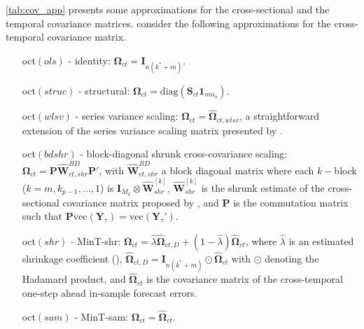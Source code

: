 \documentclass[12pt]{article}
\newcommand{\Ivet}{\bm{I}}
\newcommand{\Pvet}{\bm{P}}
\newcommand{\Svet}{\bm{S}}
\newcommand{\Wvet}{\bm{W}}
\newcommand{\Yvet}{\bm{Y}}
\newcommand{\Omegavet}{\bm{\Omega}}
\theoremstyle{definition}
\begin{document}
\autoref{tab:cov_app} presents some approximations for the cross-sectional and the temporal covariance matrices. \cite{difonzo2023} consider the following approximations for the cross-temporal covariance matrix.
\begin{itemize}[nosep, leftmargin=!, labelwidth=, align=right]
	\item[oct$(ols)$ -] identity: $\Omegavet_{ct} = \Ivet_{n(k^*+m)}$.
	\item[oct$(struc)$ -] structural: $\Omegavet_{ct} = \mathrm{diag}(\Svet_{ct} \mathbf{1}_{mn_b})$.
	\item[oct$(wlsv)$ -] series variance scaling: $\Omegavet_{ct} = \widehat{\Omegavet}_{ct,wlsv}$, a straightforward extension of the series variance scaling matrix presented by \cite{athanasopoulos2017}.
	\item[oct$(bdshr)$ -] block-diagonal shrunk cross-covariance scaling: $\Omegavet_{ct} = \Pvet\widehat{\Wvet}^{BD}_{ct,shr}\Pvet'$, with $\widehat{\Wvet}^{BD}_{ct,shr}$ a block diagonal matrix where each $k-$block ($k = m,k_{p-1},\dots, 1$) is $\Ivet_{M_k} \otimes \widehat{\Wvet}^{[k]}_{shr}$, $\widehat{\Wvet}^{[k]}_{shr}$ is the shrunk estimate of the cross-sectional covariance matrix proposed by \cite{wickramasuriya2019}, and $\Pvet$ is the commutation matrix such that $\Pvet \mathrm{vec}(\Yvet_{\tau}) = \mathrm{vec}(\Yvet_{\tau}')$.
	\item[oct$(shr)$ -] MinT-shr:   $\Omegavet_{ct} = \hat{\lambda}\widehat{\Omegavet}_{ct,D} + (1-\hat{\lambda})\widehat{\Omegavet}_{ct}$,
	where $\hat{\lambda}$ is an estimated shrinkage coefficient (\citealp{ledoit2004a}), $\widehat{\Omegavet}_{ct,D} = \Ivet_{n(k^\ast + m)} \odot \widehat{\Omegavet}_{ct}$ with $\odot$ denoting the Hadamard product, and $\widehat{\Omegavet}_{ct}$ is the covariance matrix of the cross-temporal one-step ahead in-sample forecast errors.
	\item[oct$(sam)$ -] MinT-sam:  $\Omegavet_{ct} = \widehat{\Omegavet}_{ct}$.
\end{itemize}
\end{document}
